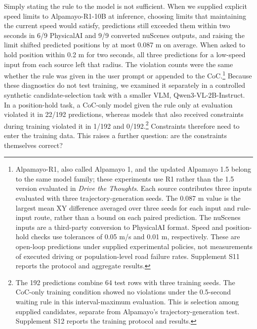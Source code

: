 \documentclass[nolineno]{ieeeaccess}
\begin{document}
Simply stating the rule to the model is not sufficient. When we supplied explicit speed limits to Alpamayo-R1-10B at inference, choosing limits that maintaining the current speed would satisfy, predictions still exceeded them within two seconds in 6/9 PhysicalAI and 9/9 converted nuScenes outputs, and raising the limit shifted predicted positions by at most 0.087 m on average. When asked to hold position within 0.2 m for two seconds, all three predictions for a low-speed input from each source left that radius. The violation counts were the same whether the rule was given in the user prompt or appended to the CoC.\footnote{Alpamayo-R1, also called Alpamayo 1, and the updated Alpamayo 1.5 belong to the same model family; these experiments use R1 rather than the 1.5 version evaluated in \emph{Drive the Thoughts}. \cite{r20} Each source contributes three inputs evaluated with three trajectory-generation seeds. The 0.087 m value is the largest mean XY difference averaged over three seeds for each input and rule-input route, rather than a bound on each paired prediction. The nuScenes inputs are a third-party conversion to PhysicalAI format. Speed and position-hold checks use tolerances of 0.05 m/s and 0.01 m, respectively. These are open-loop predictions under supplied experimental policies, not measurements of executed driving or population-level road failure rates. Supplement S11 reports the protocol and aggregate results.} Because these diagnostics do not test training, we examined it separately in a controlled synthetic candidate-selection task with a smaller VLM, Qwen3-VL-2B-Instruct. In a position-hold task, a CoC-only model given the rule only at evaluation violated it in 22/192 predictions, whereas models that also received constraints during training violated it in 1/192 and 0/192.\footnote{The 192 predictions combine 64 test rows with three training seeds. The CoC-only training condition showed no violations under the 0.5-second waiting rule in this interval-maximum evaluation. This is selection among supplied candidates, separate from Alpamayo's trajectory-generation test. Supplement S12 reports the training protocol and results.} Constraints therefore need to enter the training data. This raises a further question: are the constraints themselves correct?\par
\end{document}
